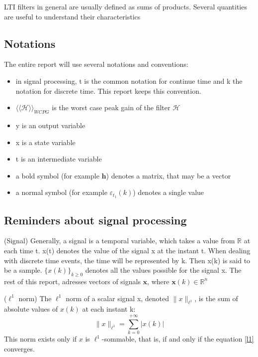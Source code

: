 	LTI filters in general are usually defined as sums of products.
	Several quantities are useful to understand their characteristics

	\subsection{Notations}
		The entire report will use several notations and conventions:
		\begin{itemize}
			\item in signal processing, t is the common notation for continue time and k the notation for discrete time. This report keeps this convention.
			\item $\langle\langle\mathcal{H}\rangle\rangle _{WCPG}$ is the worst case peak gain of the filter $\mathcal{H}$
			\item y is an output variable
			\item x is a state variable
			\item t is an intermediate variable
			\item a bold symbol (for example $\boldsymbol{h}$) denotes a matrix, that may be a vector
			\item a normal symbol (for example $\varepsilon_{t_1}(k)$) denotes a single value
		\end{itemize}

	\subsection{Reminders about signal processing}
	\begin{thdef}\label{sig} (Signal)
		Generally, a signal is a temporal variable, which takes a value from $\mathbb{R}$ at each time t.
		x(t) denotes the value of the signal x at the instant t.
		When dealing with discrete time events, the time will be represented by k.
		Then x(k) is said to be a sample.
		$\{x(k)\}_{k \geq 0}$ denotes all the values possible for the signal x.
		The rest of this report, adresses vectors of signals $\textbf{x}$, where $\textbf{x}(k) \in \mathbb{R}^{n}$
	\end{thdef}

	\begin{thdef}\label{l_1} ($\ell^1$ norm)
		The $\ell^1$ norm of a scalar signal x, denoted $\|x\|_{\ell^1}$, is the sum of absolute values of $x(k)$ at each instant k:
		\begin{equation} \label{l1}
				\|x\|_{\ell^1}=\sum_{k=0}^{+\infty}|x(k)|
		\end{equation}
		This norm exists only if $x$ is $\ell^1$-sommable, that is, if and only if the equation \ref{l1} converges.
	\end{thdef}
	
